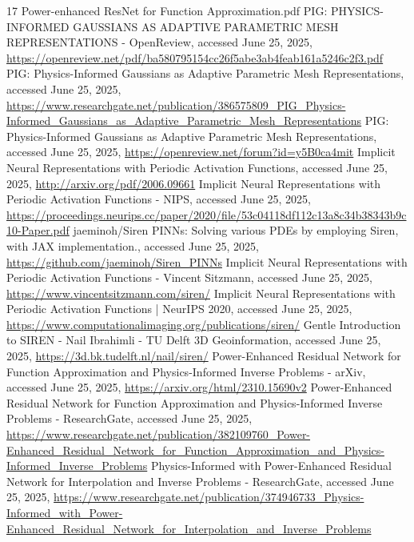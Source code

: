 \begin{thebibliography}{17}
     Power-enhanced ResNet for Function Approximation.pdf
     PIG: PHYSICS-INFORMED GAUSSIANS AS ADAPTIVE PARAMETRIC MESH REPRESENTATIONS - OpenReview, accessed June 25, 2025, \url{https://openreview.net/pdf/ba580795154cc26f5abe3ab4feab161a5246c2f3.pdf}
     PIG: Physics-Informed Gaussians as Adaptive Parametric Mesh Representations, accessed June 25, 2025, \url{https://www.researchgate.net/publication/386575809_PIG_Physics-Informed_Gaussians_as_Adaptive_Parametric_Mesh_Representations}
     PIG: Physics-Informed Gaussians as Adaptive Parametric Mesh Representations, accessed June 25, 2025, \url{https://openreview.net/forum?id=y5B0ca4mit}
     Implicit Neural Representations with Periodic Activation Functions, accessed June 25, 2025, \url{http://arxiv.org/pdf/2006.09661}
     Implicit Neural Representations with Periodic Activation Functions - NIPS, accessed June 25, 2025, \url{https://proceedings.neurips.cc/paper/2020/file/53c04118df112c13a8c34b38343b9c10-Paper.pdf}
     jaeminoh/Siren PINNs: Solving various PDEs by employing Siren, with JAX implementation., accessed June 25, 2025, \url{https://github.com/jaeminoh/Siren_PINNs}
     Implicit Neural Representations with Periodic Activation Functions - Vincent Sitzmann, accessed June 25, 2025, \url{https://www.vincentsitzmann.com/siren/}
     Implicit Neural Representations with Periodic Activation Functions | NeurIPS 2020, accessed June 25, 2025, \url{https://www.computationalimaging.org/publications/siren/}
     Gentle Introduction to SIREN - Nail Ibrahimli - TU Delft 3D Geoinformation, accessed June 25, 2025, \url{https://3d.bk.tudelft.nl/nail/siren/}
     Power-Enhanced Residual Network for Function Approximation and Physics-Informed Inverse Problems - arXiv, accessed June 25, 2025, \url{https://arxiv.org/html/2310.15690v2}
     Power-Enhanced Residual Network for Function Approximation and Physics-Informed Inverse Problems - ResearchGate, accessed June 25, 2025, \url{https://www.researchgate.net/publication/382109760_Power-Enhanced_Residual_Network_for_Function_Approximation_and_Physics-Informed_Inverse_Problems}
     Physics-Informed with Power-Enhanced Residual Network for Interpolation and Inverse Problems - ResearchGate, accessed June 25, 2025, \url{https://www.researchgate.net/publication/374946733_Physics-Informed_with_Power-Enhanced_Residual_Network_for_Interpolation_and_Inverse_Problems}

\end{thebibliography}
